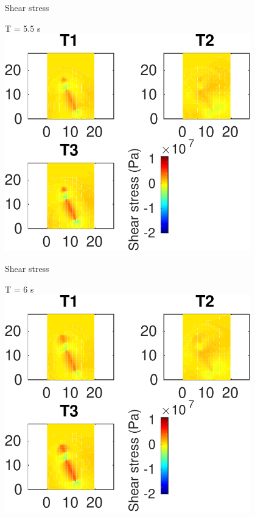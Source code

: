 \documentclass{beamer}
\begin{document}
\begin{frame}
 {Shear stress}
 
 \centering \Large T = 5.5 s\\
 \includegraphics[width=0.8\textwidth]{images/horizontal_00061}
 
\end{frame}

\begin{frame}
 {Shear stress}
 
 \centering \Large T = 6 s\\
 \includegraphics[width=0.8\textwidth]{images/horizontal_00066}
 
\end{frame}
\end{document}
